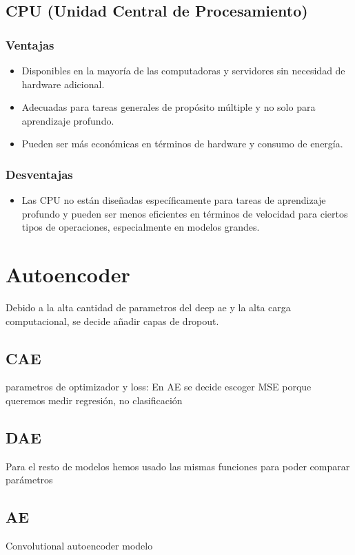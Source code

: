 \subsection{CPU (Unidad Central de Procesamiento)}

\subsubsection{Ventajas}
\begin{itemize}
    \item Disponibles en la mayoría de las computadoras y servidores sin necesidad de hardware adicional.
    \item Adecuadas para tareas generales de propósito múltiple y no solo para aprendizaje profundo.
    \item Pueden ser más económicas en términos de hardware y consumo de energía.
\end{itemize}

\subsubsection{Desventajas}
\begin{itemize}
    \item Las CPU no están diseñadas específicamente para tareas de aprendizaje profundo y pueden ser menos eficientes en términos de velocidad para ciertos tipos de operaciones, especialmente en modelos grandes.
\end{itemize}

\section{Autoencoder}
Debido a la alta cantidad de parametros del deep ae y la alta carga computacional, se decide añadir capas de dropout.

\subsection{CAE}
parametros de optimizador y loss: \citep{guo2017deep}
En AE se decide escoger MSE porque queremos medir regresión, no clasificación
\subsection{DAE}
Para el resto de modelos hemos usado las mismas funciones para poder comparar parámetros
\subsection{AE}
Convolutional autoencoder modelo \citep{xing2022malware}
